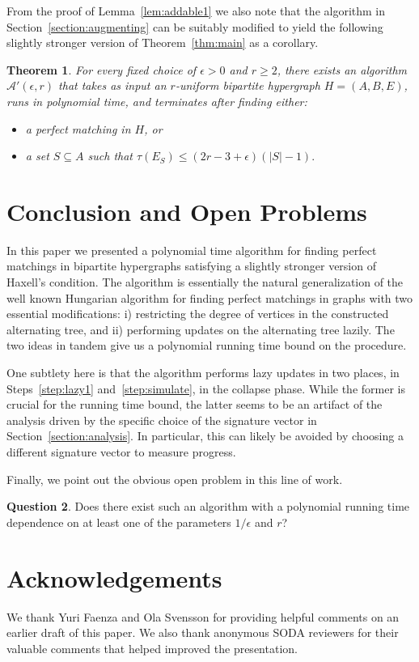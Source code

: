\documentclass[11pt]{article}
\newtheorem{theorem}{Theorem}[section]
\theoremstyle{definition}
\newtheorem{question}[theorem]{Question}
\theoremstyle{remark}
\begin{document}
 
From the proof of Lemma~\ref{lem:addable1} we also note that the
algorithm in Section~\ref{section:augmenting} can be suitably modified
to yield the following
slightly stronger version of Theorem~\ref{thm:main} as a corollary.
\begin{theorem}\label{thm:maincorollary}
  For every fixed choice of $\epsilon >0$ and $r \geq 2$, there exists
  an algorithm $\mathcal{A}'(\epsilon, r)$ that takes as input an
  $r$-uniform bipartite hypergraph $H=(A,B,E)$, runs in polynomial
  time, and terminates after finding either:
  \begin{itemize}
  \item a perfect matching in $H$, or
  \item a set $S \subseteq A$ such that $\tau(E_S) \leq (2r-3+\epsilon)(|S|-1).$
  \end{itemize}
\end{theorem}

\section{Conclusion and Open Problems}
In this paper we presented a polynomial time algorithm for finding
perfect matchings in bipartite hypergraphs satisfying a slightly
stronger version of Haxell's condition. The algorithm is essentially
the natural generalization of the well known Hungarian algorithm for
finding perfect matchings in graphs with two essential modifications:
i) restricting the degree of vertices in the constructed alternating
tree, and ii) performing updates on the alternating tree lazily. The
two ideas in tandem give us a polynomial running time bound on the
procedure.

One subtlety here is that the algorithm performs lazy updates in two
places, in Steps~\ref{step:lazy1} and~\ref{step:simulate}, in the
collapse phase. While the former is crucial for the running time
bound, the latter seems to be an artifact of the analysis driven by
the specific choice of the signature vector in
Section~\ref{section:analysis}. In particular, this can likely be
avoided by choosing a different signature vector to measure progress.

Finally, we point out the obvious open problem in this line of work.

\begin{question}
  Does there exist such an algorithm with a polynomial running time
  dependence on at least one of the parameters $1/\epsilon$ and $r$?
\end{question}

\section*{Acknowledgements}
We thank Yuri Faenza and Ola Svensson for providing helpful comments
on an earlier draft of this paper. We also thank anonymous SODA
reviewers for their valuable comments that helped improved the
presentation.



\end{document}
